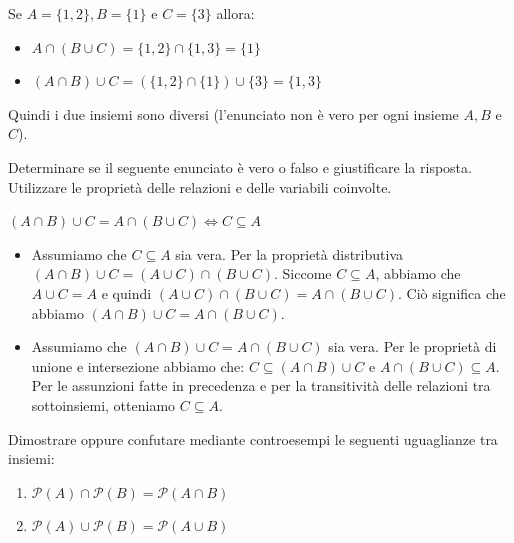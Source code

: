 \begin{soluzione}
Se $A = \{ 1,2 \}, B = \{ 1 \}$ e $C = \{ 3 \}$ allora: 
\begin{itemize}
    \item $A \cap (B \cup C) = \{ 1,2 \} \cap \{ 1,3 \} = \{ 1 \}$
    \item $(A \cap B) \cup C = (\{ 1, 2 \} \cap \{ 1 \}) \cup \{ 3 \} = \{ 1, 3 \}$
\end{itemize}
Quindi i due insiemi sono diversi (l'enunciato non è vero per ogni insieme $A,B$ e $C$). 
\end{soluzione}


\begin{esercizio}
Determinare se il seguente enunciato è vero o falso e giustificare la risposta.
Utilizzare le proprietà delle relazioni e delle variabili coinvolte. 
\begin{center}
    $(A \cap B) \cup C = A \cap (B \cup C) \Leftrightarrow C \subseteq A$
\end{center} 
\end{esercizio}

\begin{soluzione}
\begin{itemize}
    \item[$\Leftarrow$]  Assumiamo che $C\subseteq A$ sia vera. Per la proprietà distributiva $(A \cap B) \cup C = (A \cup C) \cap (B \cup C)$. Siccome $C \subseteq A$, abbiamo che $A \cup C = A$ e quindi $(A \cup C) \cap (B \cup C) = A \cap (B \cup C)$. Ciò significa che abbiamo $(A \cap B) \cup C = A \cap (B \cup C)$. 
    \item[$\Rightarrow$] Assumiamo che  $(A \cap B) \cup C = A \cap (B \cup C)$ sia vera. Per le proprietà di unione e intersezione abbiamo che: $C \subseteq (A \cap B) \cup C$ e $A \cap (B \cup C) \subseteq A$. Per le assunzioni fatte in precedenza e per la transitività delle relazioni tra sottoinsiemi, otteniamo $C \subseteq A$.  
\end{itemize} 

\end{soluzione}


\begin{esercizio}
Dimostrare oppure confutare mediante controesempi le seguenti uguaglianze tra insiemi:
\begin{enumerate}
    \item $\mathcal{P}(A) \cap \mathcal{P}(B)=\mathcal{P}(A\cap B)$
    \item $\mathcal{P}(A)\cup\mathcal{P}(B)=\mathcal{P}(A\cup B)$
\end{enumerate}
\end{esercizio}

